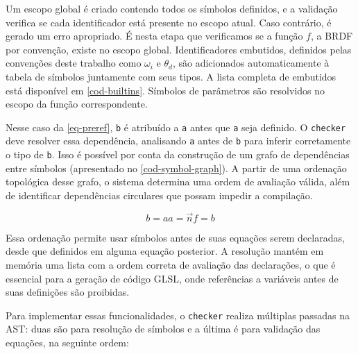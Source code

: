 Um escopo global é criado contendo todos os símbolos definidos, e a validação verifica se cada identificador está presente no escopo atual. Caso contrário, é gerado um erro apropriado. É nesta etapa que verificamos se a função $f$, a BRDF por convenção, existe no escopo global. Identificadores embutidos, definidos pelas convenções deste trabalho como $\omega_i$ e $\theta_d$, são adicionados automaticamente à tabela de símbolos juntamente com seus tipos. A lista completa de embutidos está disponível em \autoref{cod-builtins}. Símbolos de parâmetros são resolvidos no escopo da função correspondente.




Nesse caso da \autoref{eq-preref}, \texttt{b} é atribuído a \texttt{a} antes que \texttt{a} seja definido. O \texttt{checker} deve resolver essa dependência, analisando \texttt{a} antes de \texttt{b} para inferir corretamente o tipo de \texttt{b}. Isso é possível por conta da construção de um grafo de dependências entre símbolos (apresentado no \autoref{cod-symbol-graph}). A partir de uma ordenação topológica desse grafo, o sistema determina uma ordem de avaliação válida, além de identificar dependências circulares que possam impedir a compilação.

\begin{subequations} \label{eq-preref}
\begin{equation}
    b = a
\end{equation}
\begin{equation}
    a = \vec{n}
\end{equation}
\begin{equation}
    f = b
\end{equation}
\end{subequations}


Essa ordenação permite usar símbolos antes de suas equações serem declaradas, desde que definidos em alguma equação posterior. A resolução mantém em memória uma lista com a ordem correta de avaliação das declarações, o que é essencial para a geração de código GLSL, onde referências a variáveis antes de suas definições são proibidas.

Para implementar essas funcionalidades, o \texttt{checker} realiza múltiplas passadas na AST: duas são para resolução de símbolos e a última é para validação das equações, na seguinte ordem:

